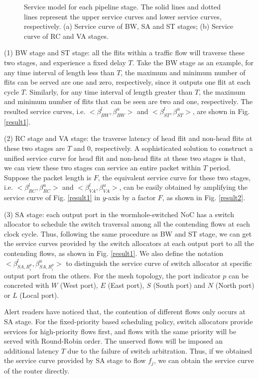 \documentclass[10pt,journal]{IEEEtran}
\begin{document}
\begin{figure}
  \caption{Service model for each pipeline stage. The solid lines and dotted lines represent the upper service curves and lower service curves, respectively. (a) Service curve of BW, SA and ST stages; (b) Service curve of RC and VA stages.}
\end{figure}

(1) BW stage and ST stage: all the flits within a traffic flow will traverse these two stages, and experience a fixed delay $T$. Take the BW stage as an example, for any time interval of length less than $T$, the maximum and minimum number of flits can be served are one and zero, respectively, since it outputs one flit at each cycle $T$. Similarly, for any time interval of length greater than $T$, the maximum and minimum number of flits that can be seen are two and one, respectively. The resulted service curves, i.e. $<\beta^l_{BW},\beta^u_{BW}>$ and $<\beta^l_{ST},\beta^u_{ST}>$, are shown in Fig. \ref{result1}.

(2) RC stage and VA stage: the traverse latency of head flit and non-head flits at these two stages are $T$ and 0, respectively. A sophisticated solution to construct a unified service curve for head flit and non-head flits at these two stages is that, we can view these two stages can service an entire packet within $T$ period. Suppose the packet length is $F$, the equivalent service curve for these two stages, i.e. $<\beta^l_{RC},\beta^u_{RC}>$ and $<\beta^l_{VA},\beta^u_{VA}>$, can be easily obtained by amplifying the service curve of Fig. \ref{result1} in $y$-axis by a factor $F$, as shown in Fig. \ref{result2}.

(3) SA stage: each output port in the wormhole-switched NoC has a switch allocator to schedule the switch traversal among all the contending flows at each clock cycle. Thus, following the same procedure as BW and ST stage, we can get the service curves provided by the switch allocators at each output port to all the contending flows, as shown in Fig. \ref{result1}. We also define the notation $<\beta_{SA,R_i^{p}}^l,\beta_{SA,R_i^{p}}^u>$ to distinguish the service curve of switch allocator at specific output port from the others. For the mesh topology, the port indicator $p$ can be concreted with $W$ (West port), $E$ (East port), $S$ (South port) and $N$ (North port) or $L$ (Local port).

Alert readers have noticed that, the contention of different flows only occurs at SA stage. For the fixed-priority based scheduling policy, switch allocators provide services for high-priority flows first, and flows with the same priority will be served with Round-Robin order. The unserved flows will be imposed an additional latency $T$ due to the failure of switch arbitration. Thus, if we obtained the service curve provided by SA stage to flow $f_j$, we can obtain the service curve of the router directly.
\end{document}
